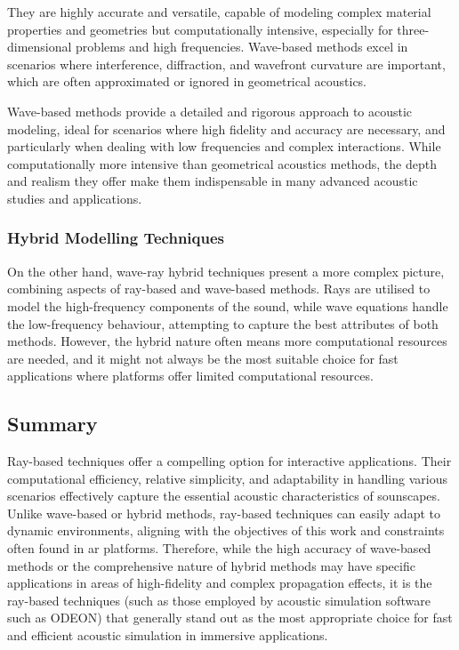 They are highly accurate and versatile, capable of modeling complex material properties and geometries but computationally intensive, especially for three-dimensional problems and high frequencies.
Wave-based methods excel in scenarios where interference, diffraction, and wavefront curvature are important, which are often approximated or ignored in geometrical acoustics.

Wave-based methods provide a detailed and rigorous approach to acoustic modeling, ideal for scenarios where high fidelity and accuracy are necessary, and particularly when dealing with low frequencies and complex interactions. While computationally more intensive than geometrical acoustics methods, the depth and realism they offer make them indispensable in many advanced acoustic studies and applications.






\subsubsection{Hybrid Modelling Techniques}
On the other hand, wave-ray hybrid techniques present a more complex picture, combining aspects of ray-based and wave-based methods. Rays are utilised to model the high-frequency components of the sound, while wave equations handle the low-frequency behaviour, attempting to capture the best attributes of both methods. However, the hybrid nature often means more computational resources are needed, and it might not always be the most suitable choice for fast applications where platforms offer limited computational resources. \cite{hulusic2012acoustic}

\subsection{Summary}
Ray-based techniques offer a compelling option for interactive applications. Their computational efficiency, relative simplicity, and adaptability in handling various scenarios effectively capture the essential acoustic characteristics of sounscapes. Unlike wave-based or hybrid methods, ray-based techniques can easily adapt to dynamic environments, aligning with the objectives of this work and constraints often found in \acrshort{ar} platforms. Therefore, while the high accuracy of wave-based methods or the comprehensive nature of hybrid methods may have specific applications in areas of high-fidelity and complex propagation effects, it is the ray-based techniques (such as those employed by acoustic simulation software such as ODEON) that generally stand out as the most appropriate choice for fast and efficient acoustic simulation in immersive applications.


